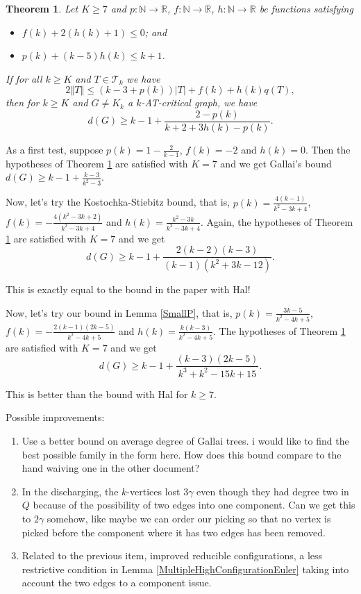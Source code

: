\documentclass[12pt]{article}
\theoremstyle{plain}
\newtheorem{thm}{Theorem}[section]
\theoremstyle{definition}
\theoremstyle{remark}
\newcommand{\fancy}[1]{\mathcal{#1}}
\newcommand{\IN}{\mathbb{N}}
\newcommand{\IR}{\mathbb{R}}
\newcommand{\T}{\fancy{T}}
\newcommand{\card}[1]{\left|#1\right|}
\newcommand{\size}[1]{\left\Vert#1\right\Vert}
\newcommand{\func}[3]{#1\colon #2 \rightarrow #3}
\begin{document}
\begin{thm}\label{UberTheorem}
	Let $K \ge 7$ and $\func{p}{\IN}{\IR}$, $\func{f}{\IN}{\IR}$, $\func{h}{\IN}{\IR}$ be functions satisfying
	\begin{itemize}
		\item $f(k) + 2(h(k) + 1) \le 0$; and
		\item $p(k) + (k-5)h(k) \le k+1$.
	\end{itemize}
    If for all $k \ge K$ and $T \in \T_k$ we have
	\[2\size{T} \le (k-3 + p(k))\card{T} + f(k) + h(k)q(T),\]
	then for $k \ge K$ and $G \ne K_k$ a $k$-AT-critical graph, we have
	\[d(G) \ge k-1 + \frac{2-p(k)}{k+2 + 3h(k) - p(k)}.\]
\end{thm}

As a first test, suppose $p(k) = 1 - \frac{2}{k-1}$, $f(k) = -2$ and $h(k) = 0$.  Then the hypotheses of Theorem \ref{UberTheorem} are satisfied with $K=7$ and we get Gallai's bound $d(G) \ge k-1 + \frac{k-3}{k^2-3}$. 

Now, let's try the Kostochka-Stiebitz bound, that is, $p(k) = \frac{4(k-1)}{k^2 - 3k + 4}$, $f(k) = -\frac{4(k^2-3k+2)}{k^2-3k+4}$ and $h(k) = \frac{k^2 - 3k}{k^2-3k+4}$.  Again, the hypotheses of Theorem \ref{UberTheorem} are satisfied with $K=7$ and we get
\[d(G) \ge k-1 + \frac{2(k-2)(k-3)}{(k-1)(k^2 + 3k - 12)}.\]

This is exactly equal to the bound in the paper with Hal!  

Now, let's try our bound in
Lemma \ref{SmallP}, that is, $p(k) = \frac{3k-5}{k^2 - 4k + 5}$, $f(k) = -\frac{2(k-1)(2k-5)}{k^2 - 4k + 5}$ and $h(k) = \frac{k(k-3)}{k^2 - 4k + 5}$.  The hypotheses of Theorem \ref{UberTheorem} are satisfied with $K=7$ and we get
 \[d(G) \ge k-1 + \frac{(k-3)(2k-5)}{k^3 + k^2 - 15k + 15}.\]
 
This is better than the bound with Hal for $k \ge 7$.  



Possible improvements:

\begin{enumerate}
	\item Use a better bound on average degree of Gallai trees.  i would like to find the best possible family in the form here.  How does this bound compare to the hand waiving one in the other document?
	\item In the discharging, the $k$-vertices lost $3\gamma$ even though they had degree two in $Q$ because of the possibility of two edges into one component.  Can we get this to $2\gamma$ somehow, like maybe we can order our picking so that no vertex is picked before the component where it has two edges has been removed.   
	\item Related to the previous item, improved reducible configurations, a less restrictive condition in Lemma \ref{MultipleHighConfigurationEuler} taking into account the two edges to a component issue.
\end{enumerate}
\end{document}
